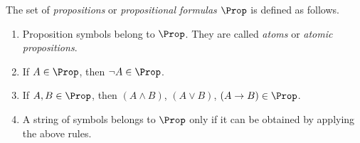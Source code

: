 \begin{dfn}
\label{dfn:PropForm}
The set of \emph{propositions} or \emph{propositional formulas} $\Prop$ is defined as follows.
\begin{enumerate}
\item
Proposition symbols belong to $\Prop$. They are called \emph{atoms} or \emph{atomic propositions}.
\item
If $A \in \Prop$, then $\neg A \in \Prop$.
\item
If $A, B \in \Prop$, then $(A \wedge B)$, $(A \vee B)$, $(A \to B) \in \Prop$.
\item
A string of symbols belongs to $\Prop$ only if it can be obtained by applying the above rules.
\end{enumerate}
\end{dfn}